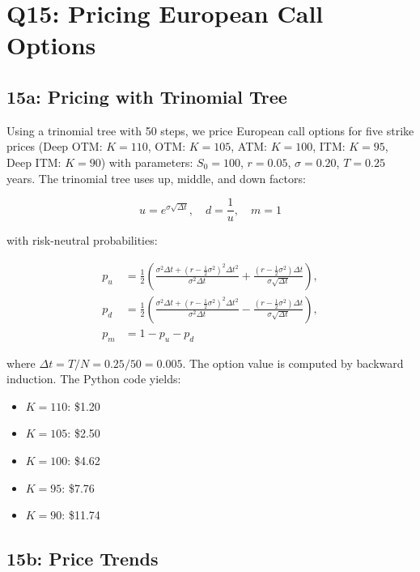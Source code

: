 \documentclass{article}
\begin{document}
\section*{Q15: Pricing European Call Options}

\subsection*{15a: Pricing with Trinomial Tree}

Using a trinomial tree with 50 steps, we price European call options for five strike prices (Deep OTM: $K=110$, OTM: $K=105$, ATM: $K=100$, ITM: $K=95$, Deep ITM: $K=90$) with parameters: $S_0 = 100$, $r = 0.05$, $\sigma = 0.20$, $T = 0.25$ years. The trinomial tree uses up, middle, and down factors:

\begin{equation}
u = e^{\sigma \sqrt{\Delta t}}, \quad d = \frac{1}{u}, \quad m = 1
\end{equation}

with risk-neutral probabilities:

\begin{align}
p_u &= \frac{1}{2} \left( \frac{\sigma^2 \Delta t + (r - \frac{1}{2} \sigma^2)^2 \Delta t^2}{\sigma^2 \Delta t} + \frac{(r - \frac{1}{2} \sigma^2) \Delta t}{\sigma \sqrt{\Delta t}} \right), \\ 
p_d &= \frac{1}{2} \left( \frac{\sigma^2 \Delta t + (r - \frac{1}{2} \sigma^2)^2 \Delta t^2}{\sigma^2 \Delta t} - \frac{(r - \frac{1}{2} \sigma^2) \Delta t}{\sigma \sqrt{\Delta t}} \right), \\
p_m &= 1 - p_u - p_d
\end{align}

where $\Delta t = T/N = 0.25/50 = 0.005$. The option value is computed by backward induction. The Python code yields:

\begin{itemize}
    \item $K=110$: \$1.20
    \item $K=105$: \$2.50
    \item $K=100$: \$4.62
    \item $K=95$: \$7.76
    \item $K=90$: \$11.74
\end{itemize}

\subsection*{15b: Price Trends}
\end{document}
